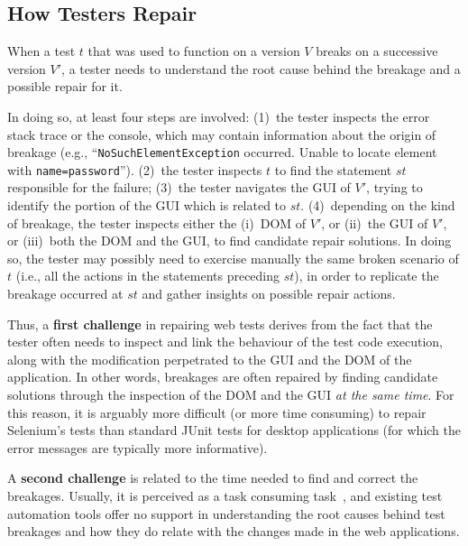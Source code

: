 
\subsection{How Testers Repair}

When a test $t$ that was used to function on a version $V$  breaks on a successive version $V'$, a tester needs to understand the root cause behind the breakage and a possible repair for it. 

In doing so, at least four steps are involved: 
(1)~the tester inspects the error stack trace or the console, which may contain information about the origin of breakage (e.g., ``\texttt{NoSuchElementException} occurred. Unable to locate element with \mbox{\texttt{name=password}}''). 
(2)~the tester inspects $t$ to find the statement $st$ responsible for the failure; %
(3)~the tester navigates the GUI of $V'$, trying to identify the portion of the GUI which is related to $st$. 
(4)~depending on the kind of breakage, the tester inspects either the (i)~DOM of $V'$, or (ii)~the GUI of $V'$, or (iii)~both the DOM and the GUI, to find candidate repair solutions. In doing so, the tester may possibly need to exercise manually the same broken scenario of $t$ (i.e., all the actions in the statements preceding $st$), in order to replicate the breakage occurred at $st$ and gather insights on possible repair actions.

Thus, a \textbf{first challenge} in repairing web tests derives from the fact that  
the tester often needs to inspect and link the behaviour of the test code execution, along with the modification perpetrated to the GUI and the DOM of the application. 
In other words, breakages are often repaired by finding candidate solutions through the inspection of the DOM and the GUI \textit{at the same time}.
For this reason, it is arguably more difficult (or more time consuming) to repair Selenium's tests than standard JUnit tests for desktop applications (for which the error messages are typically more informative).

A \textbf{second challenge} is related to the time needed to find and correct the breakages. Usually, it is perceived as a task consuming task~\cite{Leotta-TAIC-2013,JAMAICA2013}, and existing test automation tools offer no support in understanding the root causes behind test breakages and how they do relate with the changes made in the web applications. 

